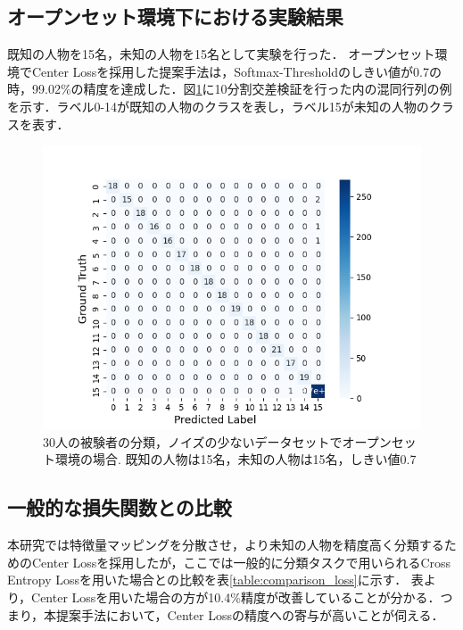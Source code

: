 \subsection{オープンセット環境下における実験結果}
既知の人物を15名，未知の人物を15名として実験を行った．
オープンセット環境でCenter Lossを採用した提案手法は，Softmax-Thresholdのしきい値が0.7の時，99.02\%の精度を達成した．図\ref{fig:30open-conf}に10分割交差検証を行った内の混同行列の例を示す．ラベル0-14が既知の人物のクラスを表し，ラベル15が未知の人物のクラスを表す．


\begin{figure}[H]
\begin{center}
\includegraphics[width=\linewidth]{./fig/clean_dataset/cross_val_Fold0_threshold0.8_15_15.png}
\end{center}
\caption{30人の被験者の分類，ノイズの少ないデータセットでオープンセット環境の場合.
既知の人物は15名，未知の人物は15名，しきい値0.7}
\label{fig:30open-conf}
\end{figure}

\subsection{一般的な損失関数との比較}
本研究では特徴量マッピングを分散させ，より未知の人物を精度高く分類するためのCenter Lossを採用したが，ここでは一般的に分類タスクで用いられるCross Entropy Lossを用いた場合との比較を表\ref{table:comparison_loss}に示す．
表より，Center Lossを用いた場合の方が10.4\%精度が改善していることが分かる．つまり，本提案手法において，Center Lossの精度への寄与が高いことが伺える．

